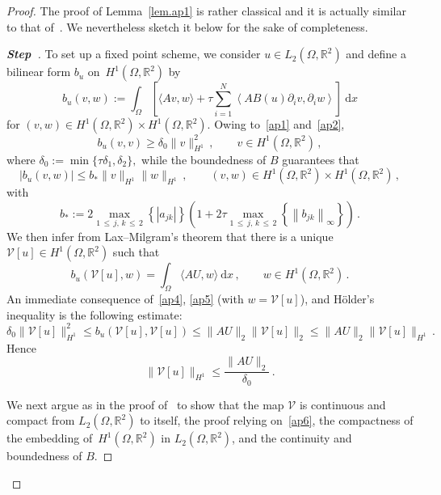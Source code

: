 \documentclass[AHL,Unicode,longabstracts,published]{cedram}
\newcommand{\bbR}{\mathbb{R}}
\newcommand{\rmd}{\mathrm{d}}
\newcommand{\clV}{\mathcal{V}}
\newcounter{stepcount}
\newenvironment{step}{\refstepcounter{stepcount}\begin{proof}[\textbf{Step~\thestepcount}]}{\let\qed\relax\end{proof}}
\begin{document}
\begin{proof}
The proof of Lemma~\ref{lem.ap1} is rather classical and it is actually similar to that of~\cite[Lemma~B.1]{LM22}. We nevertheless sketch it below for the sake of completeness.

\begin{step}
To set up a fixed point scheme, we consider $u\in L_2(\Omega,\bbR^2)$ and define a bilinear form $b_u$ on~${H^1(\Omega,\bbR^2)}$ by
\begin{equation*}
b_u(v,w) := \int_\Omega \left[\langle Av, w \rangle + \tau \sum_{i=1}^N\left\langle AB(u) \partial_i v, \partial_i w \right\rangle \right]\ \rmd x
\end{equation*}
for $ (v,w)\in H^1(\Omega,\bbR^2)\times H^1(\Omega,\bbR^2)$. Owing to~\eqref{ap1} and~\eqref{ap2},
\begin{equation}\label{ap4}
b_u(v,v) \ge \delta_0 \|v\|_{H^1}^2\,, \qquad v\in H^1\left(\Omega,\bbR^2\right)\,, 
\end{equation}
where $\delta_0:=\min\{\tau \delta_1, \delta_2\},$ while the boundedness of $B$ guarantees that
\begin{equation*}
|b_u(v,w)| \le b_* \|v\|_{H^1} \|w\|_{H^1}\,, \qquad (v,w)\in H^1\left(\Omega,\bbR^2\right)\times H^1\left(\Omega,\bbR^2\right) \,,
\end{equation*}
with
\begin{equation*}
b_* := 2\max_{1\,\le\,j,\,k\,\le\,2}\left\{\left|a_{jk}\right|\right\} \left(1 + 2\tau \max_{1\,\le\,j,\,k\,\le\,2}\left\{\left\|b_{jk}\right\|_\infty\right\} \right)\,.
\end{equation*}
We then infer from Lax--Milgram's theorem that there is a unique $\clV[u]\in H^1(\Omega,\bbR^2)$ such that
\begin{equation}\label{ap5}
b_u(\clV[u],w) = \int_\Omega \langle AU, w \rangle\ \rmd x\,, \qquad w\in H^1\left(\Omega,\bbR^2\right)\,.
\end{equation}
An immediate consequence of~\eqref{ap4}, \eqref{ap5} (with $w=\clV[u]$), and H\"older's inequality is the following estimate:
\begin{equation*}
\delta_0 \|\clV[u]\|_{H^1}^ 2 \le b_u\left(\clV[u],\clV[u]\right) \le \|AU\|_2 \|\clV[u]\|_2 \le \|AU\|_2 \|\clV[u]\|_{H^1}\,.
\end{equation*}
Hence
\begin{equation}\label{ap6}
\|\clV[u]\|_{H^1} \le \frac{\|AU\|_2}{\delta_0}\,. 
\end{equation}

We next argue as in the proof of~\cite[Lemma~B.1]{LM22} to show that the map $\clV$ is continuous and compact from $L_2(\Omega,\bbR^2)$ to itself, the proof relying on~\eqref{ap6}, the compactness of the embedding of~$H^1(\Omega,\bbR^2)$ in $L_2(\Omega,\bbR^2)$, and the continuity and boundedness of $B$.


\end{step}
\end{proof}
\end{document}
